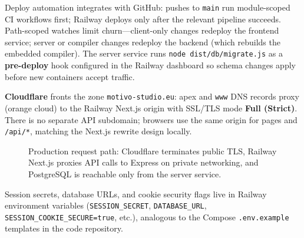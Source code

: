 Deploy automation integrates with GitHub: pushes to \texttt{main} run module-scoped CI workflows first; Railway deploys
only after the relevant pipeline succeeds.
Path-scoped watches limit churn---client-only changes redeploy the frontend service; server or compiler changes redeploy
the backend (which rebuilds the embedded compiler).
The server service runs \texttt{node dist/db/migrate.js} as a \textbf{pre-deploy} hook configured in the Railway
dashboard so schema changes apply before new containers accept traffic.

\textbf{Cloudflare} fronts the zone \texttt{motivo-studio.eu}: apex and \texttt{www} DNS records proxy (orange cloud) to
the Railway Next.js origin with SSL/TLS mode \textbf{Full (Strict)}.
There is no separate API subdomain; browsers use the same origin for pages and \texttt{/api/*}, matching the Next.js
rewrite design locally.

\begin{figure}[htbp]
  \centering
  \caption{Production request path: Cloudflare terminates public TLS, Railway Next.js proxies API calls to Express on
  private networking, and PostgreSQL is reachable only from the server service.}\label{fig:deployment-production}
\end{figure}

Session secrets, database URLs, and cookie security flags live in Railway environment variables
(\texttt{SESSION\_SECRET}, \texttt{DATABASE\_URL}, \texttt{SESSION\_COOKIE\_SECURE=true}, etc.), analogous to the
Compose \texttt{.env.example} templates in the code repository.

